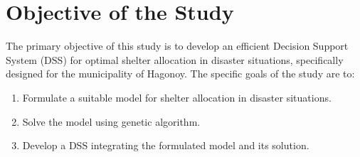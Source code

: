 \section{Objective of the Study}

The primary objective of this study is to develop an efficient Decision Support System (DSS) for optimal shelter allocation in disaster situations, specifically designed for the municipality of Hagonoy. The specific goals of the study are to:

\begin{enumerate}
	\item Formulate a suitable model for shelter allocation in disaster situations.
	\item Solve the model using genetic algorithm.
	\item Develop a DSS integrating the formulated model and its solution.
\end{enumerate}
